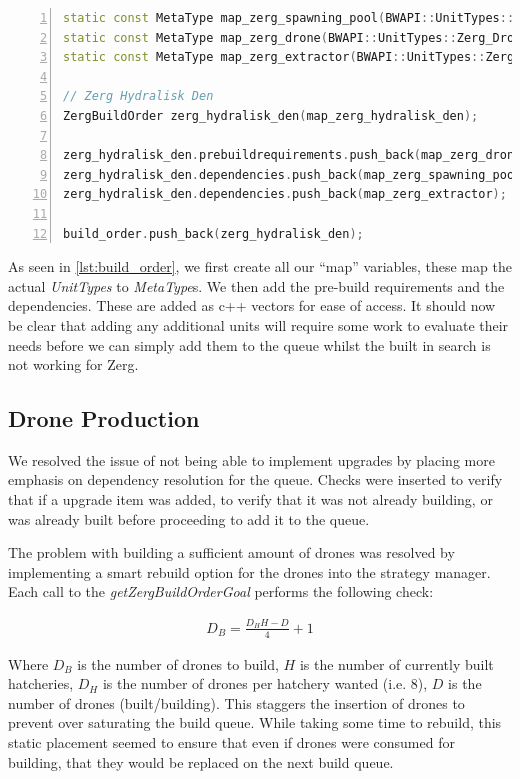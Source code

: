 \documentclass{article}
\begin{document}
\begin{lstlisting}[language=c++, frame=single, basicstyle=\footnotesize, caption={Inserting a Build Order}, label=lst:build_order, numbers=left]
static const MetaType map_zerg_spawning_pool(BWAPI::UnitTypes::Zerg_Spawning_Pool);
static const MetaType map_zerg_drone(BWAPI::UnitTypes::Zerg_Drone);
static const MetaType map_zerg_extractor(BWAPI::UnitTypes::Zerg_Extractor);

// Zerg Hydralisk Den
ZergBuildOrder zerg_hydralisk_den(map_zerg_hydralisk_den);

zerg_hydralisk_den.prebuildrequirements.push_back(map_zerg_drone);
zerg_hydralisk_den.dependencies.push_back(map_zerg_spawning_pool);
zerg_hydralisk_den.dependencies.push_back(map_zerg_extractor);

build_order.push_back(zerg_hydralisk_den);
\end{lstlisting}

As seen in \autoref{lst:build_order}, we first create all our ``map'' variables, these map the actual \textit{UnitTypes} to \textit{MetaType}s. We then add the pre-build requirements and the dependencies. These are added as c++ vectors for ease of access. It should now be clear that adding any additional units will require some work to evaluate their needs before we can simply add them to the queue whilst the built in search is not working for Zerg.

\subsection{Drone Production}
We resolved the issue of not being able to implement upgrades by placing more emphasis on dependency resolution for the queue. Checks were inserted to verify that if a upgrade item was added, to verify that it was not already building, or was already built before proceeding to add it to the queue.

The problem with building a sufficient amount of drones was resolved by implementing a smart rebuild option for the drones into the strategy manager. Each call to the \textit{getZergBuildOrderGoal} performs the following check:

\begin{align}
    D_B = \frac{D_H H - D}{4} + 1
\end{align}

Where $D_B$ is the number of drones to build, $H$ is the number of currently built hatcheries, $D_H$ is the number of drones per hatchery wanted (i.e. $8$), $D$ is the number of drones (built/building). This staggers the insertion of drones to prevent over saturating the build queue. While taking some time to rebuild, this static placement seemed to ensure that even if drones were consumed for building, that they would be replaced on the next build queue.
\end{document}
